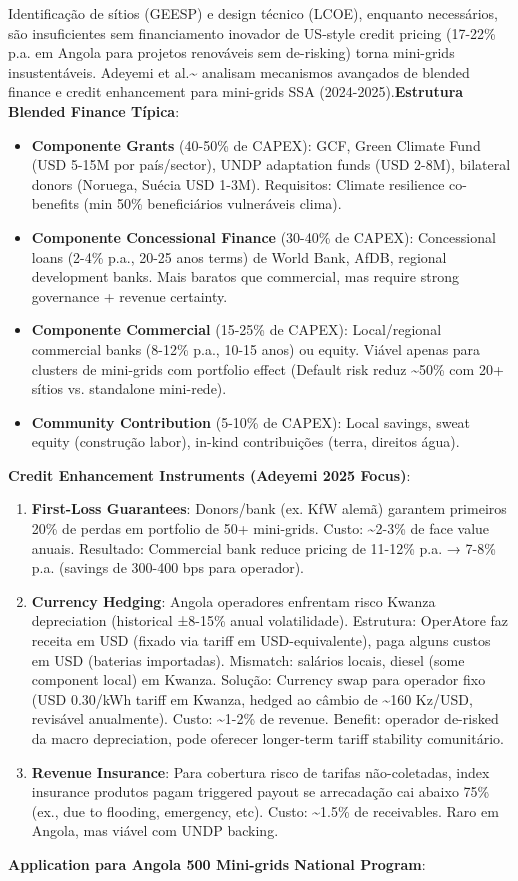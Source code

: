 \documentclass[12pt, a4paper]{article}
\begin{document}
Identificação de sítios (GEESP) e design técnico (LCOE), enquanto necessários, são insuficientes sem financiamento inovador de US-style credit pricing (17-22\% p.a. em Angola para projetos renováveis sem de-risking) torna mini-grids insustentáveis. Adeyemi et al.\textasciitilde{}\citep{Adeyemi2025} analisam mecanismos avançados de blended finance e credit enhancement para mini-grids SSA (2024-2025).\textbf{Estrutura Blended Finance Típica}:
\begin{itemize}
\item\textbf{Componente Grants} (40-50\% de CAPEX): GCF, Green Climate Fund (USD 5-15M por país/sector), UNDP adaptation funds (USD 2-8M), bilateral donors (Noruega, Suécia USD 1-3M). Requisitos: Climate resilience co-benefits (min 50\% beneficiários vulneráveis clima).
\item\textbf{Componente Concessional Finance} (30-40\% de CAPEX): Concessional loans (2-4\% p.a., 20-25 anos terms) de World Bank, AfDB, regional development banks. Mais baratos que commercial, mas require strong governance + revenue certainty.
\item\textbf{Componente Commercial} (15-25\% de CAPEX): Local/regional commercial banks (8-12\% p.a., 10-15 anos) ou equity. Viável apenas para clusters de mini-grids com portfolio effect (Default risk reduz \textasciitilde{}50\% com 20+ sítios vs. standalone mini-rede).
\item\textbf{Community Contribution} (5-10\% de CAPEX): Local savings, sweat equity (construção labor), in-kind contribuições (terra, direitos água).
\end{itemize}\textbf{Credit Enhancement Instruments (Adeyemi 2025 Focus)}:
\begin{enumerate}
\item\textbf{First-Loss Guarantees}: Donors/bank (ex. KfW alemã) garantem primeiros 20\% de perdas em portfolio de 50+ mini-grids. Custo: \textasciitilde{}2-3\% de face value anuais. Resultado: Commercial bank reduce pricing de 11-12\% p.a. → 7-8\% p.a. (savings de 300-400 bps para operador).
\item\textbf{Currency Hedging}: Angola operadores enfrentam risco Kwanza depreciation (historical ±8-15\% anual volatilidade). Estrutura: OperAtore faz receita em USD (fixado via tariff em USD-equivalente), paga alguns custos em USD (baterias importadas). Mismatch: salários locais, diesel (some component local) em Kwanza. Solução: Currency swap para operador fixo (USD 0.30/kWh tariff em Kwanza, hedged ao câmbio de \textasciitilde{}160 Kz/USD, revisável anualmente). Custo: \textasciitilde{}1-2\% de revenue. Benefit: operador de-risked da macro depreciation, pode oferecer longer-term tariff stability comunitário.
\item\textbf{Revenue Insurance}: Para cobertura risco de tarifas não-coletadas, index insurance produtos pagam triggered payout se arrecadação cai abaixo 75\% (ex., due to flooding, emergency, etc). Custo: \textasciitilde{}1.5\% de receivables. Raro em Angola, mas viável com UNDP backing.
\end{enumerate}\textbf{Application para Angola 500 Mini-grids National Program}:
\end{document}
